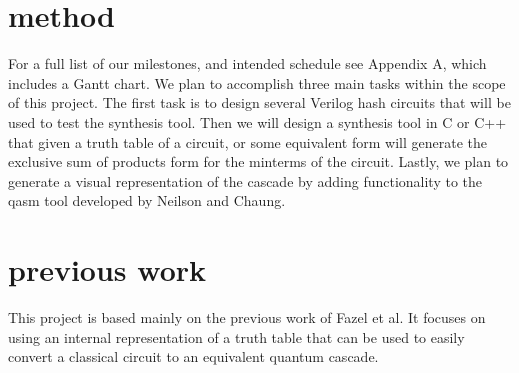 \documentclass{IEEEtran}
\begin{document}
\section{method}

For a full list of our milestones, and intended schedule see Appendix A, which includes a Gantt chart. We plan to accomplish three main tasks within the scope of this project. The first task is to design several Verilog hash circuits that will be used to test the synthesis tool. Then we will design a synthesis tool in C or C++ that given a truth table of a circuit, or some equivalent form will generate the exclusive sum of products form for the minterms of the circuit. Lastly, we plan to generate a visual representation of the cascade by adding functionality to the qasm tool developed by Neilson and Chaung. \cite{}

\section{previous work}
This project is based mainly on the previous work of Fazel et al. \cite{4313212} It focuses on using an internal representation of a truth table that can be used to easily convert a classical circuit to an equivalent quantum cascade. 

{}




\end{document}

